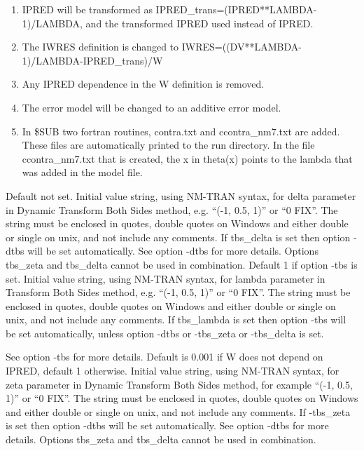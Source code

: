 \begin{optionlist}
\begin{enumerate}
	\item IPRED will be transformed as 
 IPRED\_trans=(IPRED**LAMBDA-1)/LAMBDA, 
 and the transformed  IPRED used instead of IPRED.  
	\item The IWRES definition is changed to 
 IWRES=((DV**LAMBDA-1)/LAMBDA-IPRED\_trans)/W
	\item Any IPRED dependence in the W definition is removed.
	\item The error model will be changed to an additive error model.
	\item In \$SUB two fortran routines, contra.txt and ccontra\_nm7.txt are added. These files are automatically printed to the run directory. In the file ccontra\_nm7.txt that is created, the x in theta(x) points to the lambda that was added in the model file.
\end{enumerate}
\nextopt
{}
Default not set. Initial value string, using NM-TRAN syntax, for delta parameter in Dynamic Transform Both Sides method, e.g. ``(-1, 0.5, 1)'' or ``0 FIX''. The string must be enclosed in quotes, double quotes on Windows and either double or single on unix, and not include any comments. If tbs\_delta is set then option -dtbs will be set automatically. See option -dtbs for more details. Options tbs\_zeta and tbs\_delta cannot be used in combination.  
\nextopt
{}
Default 1 if option -tbs is set. Initial value string, using NM-TRAN syntax, for lambda parameter in Transform Both Sides method, e.g. ``(-1, 0.5, 1)'' or ``0 FIX''. The string must be enclosed in quotes, double quotes on Windows and either double or single on unix, and not include any comments. If tbs\_lambda is set then option -tbs will be set automatically, unless option -dtbs or -tbs\_zeta or -tbs\_delta is set. 

See option -tbs for more details. 
\nextopt
{}
Default is 0.001 if W does not depend on IPRED, default 1 otherwise. Initial value string, using NM-TRAN syntax, for zeta parameter in Dynamic Transform Both Sides method, for example ``(-1, 0.5, 1)'' or ``0 FIX''. The string must be enclosed in quotes, double quotes on Windows and either double or single on unix, and not include any comments. If -tbs\_zeta is set then option -dtbs will be set automatically. See option -dtbs for more details. Options tbs\_zeta and tbs\_delta cannot be used in combination.  
\nextopt
\end{optionlist}

